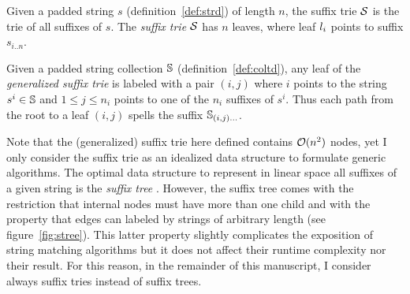 \begin{definition}
Given a padded string $s$ (definition~\ref{def:strd}) of length $n$, the suffix trie $\mathcal {S}$ is the trie of all suffixes of $s$.
The \emph{suffix trie} $\mathcal {S}$ has $n$ leaves, where leaf $l_i$ points to suffix $s_{i..n}$.
\end{definition}
\begin{definition}
Given a padded string collection $\mathbb {S}$ (definition~\ref{def:coltd}), any leaf of the \emph{generalized suffix trie} is labeled with a pair $(i,j)$ where $i$ points to the string $s^i \in \mathbb {S}$ and $1 \leq j \leq n_i$ points to one of the $n_i$ suffixes of $s^i$.
Thus each path from the root to a leaf $(i,j)$ spells the suffix $\mathbb {S}_{(i,j) \dots}$.
\end{definition}

Note that the (generalized) suffix trie here defined contains $\mathcal{O}(n^2)$ nodes, yet I only consider the suffix trie as an idealized data structure to formulate generic algorithms.
The optimal data structure to represent in linear space all suffixes of a given string is the \emph{suffix tree} \citep{Morrison1968}.
However, the suffix tree comes with the restriction that internal nodes must have more than one child and with the property that edges can labeled by strings of arbitrary length (see figure~\ref{fig:stree}).
This latter property slightly complicates the exposition of string matching algorithms but it does not affect their runtime complexity nor their result.
For this reason, in the remainder of this manuscript, I consider \wlogs always suffix tries instead of suffix trees.

\begin{figure}[h]
\caption[Example of suffix trie and suffix tree]{Suffix trie and suffix tree of the string {\ttfamily ANANAS\$} .}
\label{fig:stree}
\begin{subfigure}{.5\textwidth}
\begin{center}

\end{center}
\end{subfigure}%
\begin{subfigure}{.5\textwidth}
\begin{center}

\end{center}
\end{subfigure}
\end{figure}

